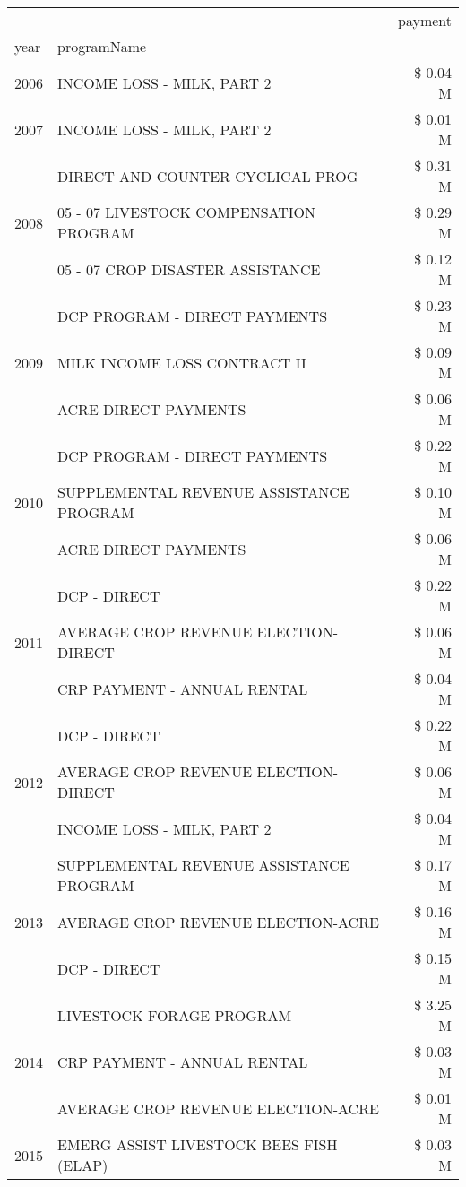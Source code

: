 \begin{tabular}{llr}
\toprule
 &  & payment \\
year & programName &  \\
\midrule
2006 & INCOME LOSS - MILK, PART 2 & \$ 0.04 M \\
\cline{1-3}
2007 & INCOME LOSS - MILK, PART 2 & \$ 0.01 M \\
\cline{1-3}
\multirow[t]{3}{*}{2008} & DIRECT AND COUNTER CYCLICAL PROG & \$ 0.31 M \\
 & 05 - 07 LIVESTOCK COMPENSATION PROGRAM & \$ 0.29 M \\
 & 05 - 07 CROP DISASTER ASSISTANCE & \$ 0.12 M \\
\cline{1-3}
\multirow[t]{3}{*}{2009} & DCP PROGRAM - DIRECT PAYMENTS & \$ 0.23 M \\
 & MILK INCOME LOSS CONTRACT II & \$ 0.09 M \\
 & ACRE DIRECT PAYMENTS & \$ 0.06 M \\
\cline{1-3}
\multirow[t]{3}{*}{2010} & DCP PROGRAM - DIRECT PAYMENTS & \$ 0.22 M \\
 & SUPPLEMENTAL REVENUE ASSISTANCE PROGRAM & \$ 0.10 M \\
 & ACRE DIRECT PAYMENTS & \$ 0.06 M \\
\cline{1-3}
\multirow[t]{3}{*}{2011} & DCP - DIRECT & \$ 0.22 M \\
 & AVERAGE CROP REVENUE ELECTION-DIRECT & \$ 0.06 M \\
 & CRP PAYMENT - ANNUAL RENTAL & \$ 0.04 M \\
\cline{1-3}
\multirow[t]{3}{*}{2012} & DCP - DIRECT & \$ 0.22 M \\
 & AVERAGE CROP REVENUE ELECTION-DIRECT & \$ 0.06 M \\
 & INCOME LOSS - MILK, PART 2 & \$ 0.04 M \\
\cline{1-3}
\multirow[t]{3}{*}{2013} & SUPPLEMENTAL REVENUE ASSISTANCE PROGRAM & \$ 0.17 M \\
 & AVERAGE CROP REVENUE ELECTION-ACRE & \$ 0.16 M \\
 & DCP - DIRECT & \$ 0.15 M \\
\cline{1-3}
\multirow[t]{3}{*}{2014} & LIVESTOCK FORAGE PROGRAM & \$ 3.25 M \\
 & CRP PAYMENT - ANNUAL RENTAL & \$ 0.03 M \\
 & AVERAGE CROP REVENUE ELECTION-ACRE & \$ 0.01 M \\
\cline{1-3}
\multirow[t]{3}{*}{2015} & EMERG ASSIST LIVESTOCK BEES FISH (ELAP) & \$ 0.03 M \\

\end{tabular}
